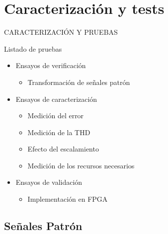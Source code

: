 \section{Caracterización y tests}

\begin{frame}
\begin{center}
\Huge CARACTERIZACIÓN Y PRUEBAS
\end{center}
\end{frame}

\begin{frame}{Listado de pruebas}
  \begin{itemize}
    \item<1-> Ensayos de verificación
    \begin{itemize}
      \Fontitit
      \item<2-> Transformación de señales patrón
    \end{itemize}
    \item<3-> Ensayos de caracterización
    \begin{itemize}
      \Fontitit
      \item<4-> Medición del error
      \item<5-> Medición de la THD
      \item<6-> Efecto del escalamiento
      \item<7-> Medición de los recursos necesarios 
    \end{itemize}
    \item<8-> Ensayos de validación
    \begin{itemize}
      \Fontitit
      \item<9-> Implementación en FPGA
    \end{itemize}
  \end{itemize}
\end{frame}

\subsection{Señales Patrón}

